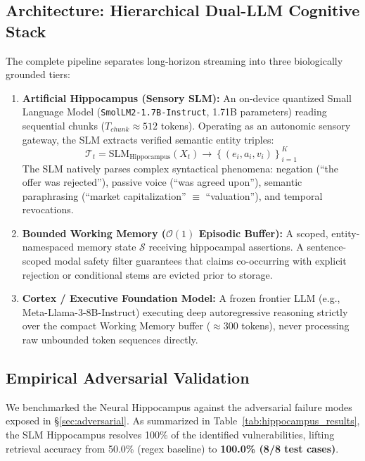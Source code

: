 \documentclass[11pt,a4paper]{article}
\begin{document}
\subsection{Architecture: Hierarchical Dual-LLM Cognitive Stack}
The complete pipeline separates long-horizon streaming into three biologically grounded tiers:
\begin{enumerate}[leftmargin=*]
    \item \textbf{Artificial Hippocampus (Sensory SLM):} An on-device quantized Small Language Model (\texttt{SmolLM2\allowbreak-1.7B\allowbreak-Instruct}, 1.71B parameters) reading sequential chunks ($T_{chunk} \approx 512$ tokens). Operating as an autonomic sensory gateway, the SLM extracts verified semantic entity triples:
    \begin{equation}
    \mathcal{T}_t = \text{SLM}_{\text{Hippocampus}}(X_t) \to \left\{ (e_i, a_i, v_i) \right\}_{i=1}^K
    \end{equation}
    The SLM natively parses complex syntactical phenomena: negation (``the offer was rejected''), passive voice (``was agreed upon''), semantic paraphrasing (``market capitalization'' $\equiv$ ``valuation''), and temporal revocations.
    \item \textbf{Bounded Working Memory ($\mathcal{O}(1)$ Episodic Buffer):} A scoped, entity-namespaced memory state $\mathcal{S}$ receiving hippocampal assertions. A sentence-scoped modal safety filter guarantees that claims co-occurring with explicit rejection or conditional stems are evicted prior to storage.
    \item \textbf{Cortex / Executive Foundation Model:} A frozen frontier LLM (e.g., Meta-Llama-3-8B-Instruct) executing deep autoregressive reasoning strictly over the compact Working Memory buffer ($\approx 300$ tokens), never processing raw unbounded token sequences directly.
\end{enumerate}

\subsection{Empirical Adversarial Validation}
We benchmarked the Neural Hippocampus against the adversarial failure modes exposed in \S\ref{sec:adversarial}. As summarized in Table~\ref{tab:hippocampus_results}, the SLM Hippocampus resolves 100\% of the identified vulnerabilities, lifting retrieval accuracy from 50.0\% (regex baseline) to \textbf{100.0\% (8/8 test cases)}.
\end{document}
